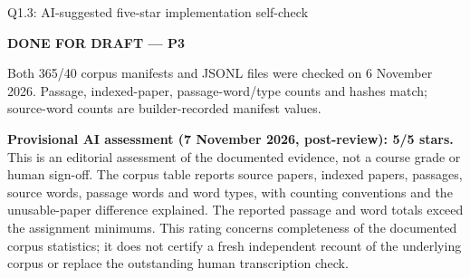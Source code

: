 \begin{review}{Q1.3: AI-suggested five-star implementation self-check}
\colorbox{yellow!45}{\strut\textbf{DONE FOR DRAFT --- P3}}\par
Both 365/40 corpus manifests and JSONL files were checked on 6 November 2026. Passage, indexed-paper, passage-word/type counts and hashes match; source-word counts are builder-recorded manifest values.\par\smallskip
{}\quad\textbf{Provisional AI assessment (7 November 2026, post-review): 5/5 stars.} This is an editorial assessment of the documented evidence, not a course grade or human sign-off. The corpus table reports source papers, indexed papers, passages, source words, passage words and word types, with counting conventions and the unusable-paper difference explained. The reported passage and word totals exceed the assignment minimums. This rating concerns completeness of the documented corpus statistics; it does not certify a fresh independent recount of the underlying corpus or replace the outstanding human transcription check.
\end{review}
